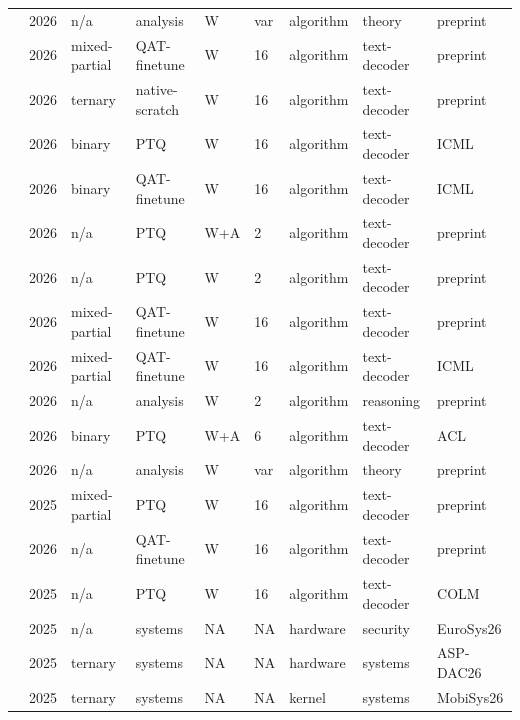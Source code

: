 \begin{landscape}
\begin{longtable}{p{3.2cm} p{1cm} p{1.9cm} p{2.2cm} p{2.2cm} p{1.3cm} p{2.2cm} p{2.1cm} p{2.5cm}}
\citet{Anon2026-ExpressivePowerWQ} & 2026 & n/\allowbreak{}a & analysis & W & var & algorithm & theory & preprint \\
\citet{Wang2026-HESTIA} & 2026 & mixed-partial & QAT-finetune & W & 16 & algorithm & text-decoder & preprint \\
\citet{Anon2026-HGF} & 2026 & ternary & native-scratch & W & 16 & algorithm & text-decoder & preprint \\
\citet{Chong2026-NanoQuant} & 2026 & binary & PTQ & W & 16 & algorithm & text-decoder & ICML \\
\citet{You2026-RaBiT} & 2026 & binary & QAT-finetune & W & 16 & algorithm & text-decoder & ICML \\
\citet{Zagitov2026-HARP} & 2026 & n/\allowbreak{}a & PTQ & W+\allowbreak{}A & 2 & algorithm & text-decoder & preprint \\
\citet{Pavlov2026-InfluenceRotations} & 2026 & n/\allowbreak{}a & PTQ & W & 2 & algorithm & text-decoder & preprint \\
\citet{Zhang2026-pQuant} & 2026 & mixed-partial & QAT-finetune & W & 16 & algorithm & text-decoder & preprint \\
\citet{Wang2026-LCQAT} & 2026 & mixed-partial & QAT-finetune & W & 16 & algorithm & text-decoder & ICML \\
\citet{Alimaskina2026-ExtremeReasoning} & 2026 & n/\allowbreak{}a & analysis & W & 2 & algorithm & reasoning & preprint \\
\citet{Zhao2026-BWLA} & 2026 & binary & PTQ & W+\allowbreak{}A & 6 & algorithm & text-decoder & ACL \\
\citet{Xu2026-FittingNotEnough} & 2026 & n/\allowbreak{}a & analysis & W & var & algorithm & theory & preprint \\
\citet{Wang2025-Fairy2i} & 2025 & mixed-partial & PTQ & W & 16 & algorithm & text-decoder & preprint \\
\citet{Maskey2026-1BitWonder} & 2026 & n/\allowbreak{}a & QAT-finetune & W & 16 & algorithm & text-decoder & preprint \\
\citet{Li2025-ICQuant} & 2025 & n/\allowbreak{}a & PTQ & W & 16 & algorithm & text-decoder & COLM \\
\citet{Wang2025-TZLLM} & 2025 & n/\allowbreak{}a & systems & NA & NA & hardware & security & Euro\allowbreak{}Sys26 \\
\citet{Shan2025-Platinum} & 2025 & ternary & systems & NA & NA & hardware & systems & ASP-DAC26 \\
\citet{Li2025-VecLUT} & 2025 & ternary & systems & NA & NA & kernel & systems & Mobi\allowbreak{}Sys26 \\

\end{longtable}
\end{landscape}
